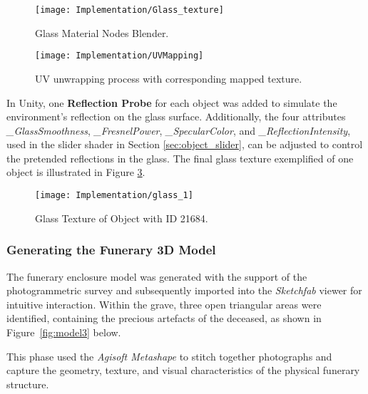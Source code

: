 \begin{figure}[h!]
    \centering
    \texttt{[image: Implementation/Glass\_texture]}
    \caption{Glass Material Nodes Blender.}
    \label{fig:glass_texture}    
\end{figure}


\begin{figure}[h!]
    \centering
    \texttt{[image: Implementation/UVMapping]}
    \caption{UV unwrapping process with corresponding mapped texture.}
    \label{fig:uv_process}
\end{figure}


In Unity, one \textbf{Reflection Probe} for each object was added to simulate the environment's reflection on the glass surface.
Additionally, the four attributes \emph{\_GlassSmoothness}, \emph{\_FresnelPower}, \emph{\_SpecularColor}, and \emph{\_ReflectionIntensity}, used in the slider shader in Section \ref{sec:object_slider}, can be adjusted to control the pretended reflections in the glass.
The final glass texture exemplified of one object is illustrated in Figure \ref{fig:glass1}.

\begin{figure}[h!]
    \centering
    \texttt{[image: Implementation/glass\_1]}
    \caption{Glass Texture of Object with ID 21684.}
    \label{fig:glass1}
\end{figure}



\subsubsection{Generating the Funerary \gls{3D} Model}
\label{sec:build_model}

The funerary enclosure model was generated with the support of the photogrammetric survey and subsequently imported into the \textit{Sketchfab} viewer for intuitive interaction.
Within the grave, three open triangular areas were identified, containing the precious artefacts of the deceased, as shown in Figure~\ref{fig:model3} below.

This phase used the \textit{Agisoft Metashape} to stitch together photographs and capture the geometry, texture, and visual characteristics of the physical funerary structure.

